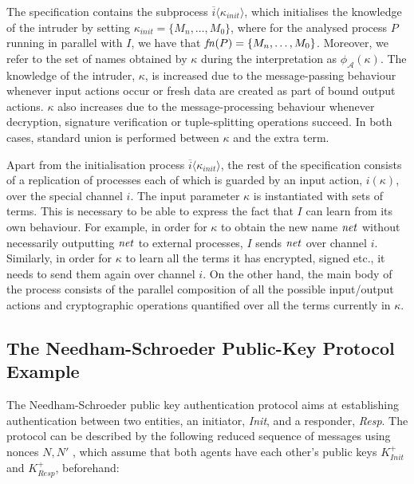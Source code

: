 \documentclass[10pt,a4paper,final,oneside,fleqn]{book}
\begin{document}
The specification contains the subprocess $\overline{i}\langle\kappa_{init}\rangle$, which initialises the knowledge of the intruder by setting $\kappa_{init}=\{M_n,\ldots,M_0\}$, where for the analysed process $P$ running in parallel with $I$, we have that $\mbox{{\itshape fn\/}}(P)=\{M_n,\ldots,M_0\}$.  Moreover, we refer to the set of names obtained by $\kappa$ during the interpretation as $\phi_\mathcal{A}(\kappa)$.  The knowledge of the intruder, $\kappa$, is increased due to the message-passing behaviour whenever input actions occur or fresh data are created as part of bound output actions.  $\kappa$ also increases due to the message-processing behaviour whenever decryption, signature verification or tuple-splitting operations succeed.  In both cases, standard union is performed between $\kappa$ and the extra term.

Apart from the initialisation process $\overline{i}\langle\kappa_{init}\rangle$, the rest of the specification consists of a replication of processes each of which is guarded by an input action, $i(\kappa)$, over the special channel $i$.  The input parameter $\kappa$ is instantiated with sets of terms.  This is necessary to be able to express the fact that $I$ can learn from its own behaviour.  For example, in order for $\kappa$ to obtain the new name $\mbox{{\itshape net\/}}$ without necessarily outputting $\mbox{{\itshape net\/}}$ to external processes, $I$ sends $\mbox{{\itshape net\/}}$ over channel $i$.  Similarly, in order for $\kappa$ to learn all the terms it has encrypted, signed etc., it needs to send them again over channel $i$.  On the other hand, the main body of the process consists of the parallel composition of all the possible input/output actions and cryptographic operations quantified over all the terms currently in $\kappa$.
\subsection{The Needham-Schroeder Public-Key Protocol Example\label{sect:anneedham}}
The Needham-Schroeder public key authentication protocol \cite{needham1} aims at establishing authentication between two entities, an initiator, {\itshape Init\/}, and a responder, {\itshape Resp\/}.  The protocol can be described by the following reduced sequence of messages using nonces $N,N'$ \cite{lowe1}, which assume that both agents have each other's public keys $K^+_{Init}$ and $K^+_{Resp}$, beforehand:
\end{document}
